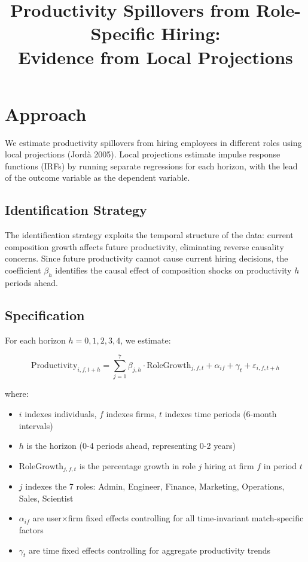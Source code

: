 \documentclass[11pt]{article}
\title{Productivity Spillovers from Role-Specific Hiring: \\
       Evidence from Local Projections}
\author{}
\date{}
\begin{document}
\maketitle

\section{Approach}

We estimate productivity spillovers from hiring employees in different roles using local projections (Jord\`{a} 2005). Local projections estimate impulse response functions (IRFs) by running separate regressions for each horizon, with the lead of the outcome variable as the dependent variable.

\subsection{Identification Strategy}

The identification strategy exploits the temporal structure of the data: current composition growth affects future productivity, eliminating reverse causality concerns. Since future productivity cannot cause current hiring decisions, the coefficient $\beta_h$ identifies the causal effect of composition shocks on productivity $h$ periods ahead.

\subsection{Specification}

For each horizon $h = 0, 1, 2, 3, 4$, we estimate:

\begin{equation}
\text{Productivity}_{i,f,t+h} = \sum_{j=1}^{7} \beta_{j,h} \cdot \text{RoleGrowth}_{j,f,t} + \alpha_{if} + \gamma_{t} + \varepsilon_{i,f,t+h}
\end{equation}

where:
\begin{itemize}
\item $i$ indexes individuals, $f$ indexes firms, $t$ indexes time periods (6-month intervals)
\item $h$ is the horizon (0-4 periods ahead, representing 0-2 years)
\item $\text{RoleGrowth}_{j,f,t}$ is the percentage growth in role $j$ hiring at firm $f$ in period $t$
\item $j$ indexes the 7 roles: Admin, Engineer, Finance, Marketing, Operations, Sales, Scientist
\item $\alpha_{if}$ are user$\times$firm fixed effects controlling for all time-invariant match-specific factors
\item $\gamma_t$ are time fixed effects controlling for aggregate productivity trends
\end{itemize}
\end{document}
